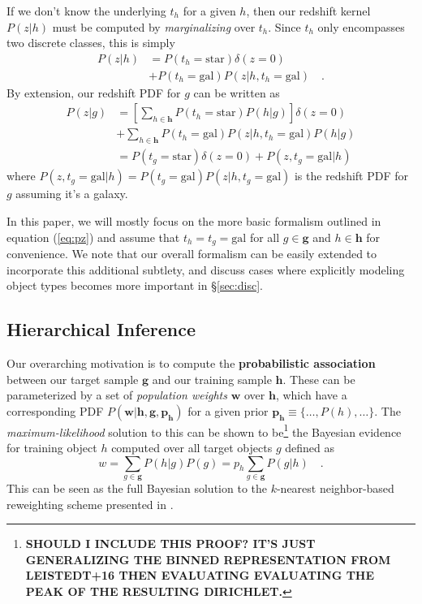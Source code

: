 \documentclass[a4paper,fleqn,usenatbib,english]{mnras}
\begin{document}
If we don't know the underlying $t_h$ for a given $h$, then our redshift kernel $P(z|h)$ must be computed by \textit{marginalizing} over $t_h$. Since $t_h$ only encompasses two discrete classes, this is simply
\begin{align}
P(z|h)&=P(t_h=\mathrm{star})\delta(z=0) \nonumber \\
&+P(t_h=\mathrm{gal})P(z|h,t_h=\mathrm{gal}) \quad .
\end{align}
By extension, our redshift PDF for $g$ can be written as
\begin{align}
P(z|g)&=\left[\sum_{h\in\mathbf{h}}P(t_h=\mathrm{star})P(h|g)\right]\delta(z=0) \nonumber \\
&+\sum_{h\in\mathbf{h}}P(t_h=\mathrm{gal})P(z|h,t_h=\mathrm{gal})P(h|g) \\
&=P(t_g=\mathrm{star})\delta(z=0) + P(z,t_g=\mathrm{gal}|h) \nonumber
\end{align}
where $P(z,t_g=\mathrm{gal}|h)=P(t_g=\mathrm{gal})P(z|h,t_g=\mathrm{gal})$ is the redshift PDF for $g$ assuming it's a galaxy.

In this paper, we will mostly focus on the more basic formalism outlined in equation (\ref{eq:pz}) and assume that $t_h = t_g = \mathrm{gal}$ for all $g \in \mathbf{g}$ and $h \in \mathbf{h}$ for convenience. We note that our overall formalism can be easily extended to incorporate this additional subtlety, and discuss cases where explicitly modeling object types becomes more important in \S\ref{sec:disc}.

\subsection{Hierarchical Inference}
\label{subsec:pop_infer}

Our overarching motivation is to compute the \textbf{probabilistic association} between our target sample $\mathbf{g}$ and our training sample $\mathbf{h}$. These can be parameterized by a set of \textit{population weights} $\mathbf{w}$ over $\mathbf{h}$, which have a corresponding PDF $P(\mathbf{w}|\mathbf{h},\mathbf{g},\mathbf{p_h})$ for a given prior $\mathbf{p_h} \equiv \lbrace \ldots,P(h),\ldots \rbrace$. The \textit{maximum-likelihood} solution to this can be shown to be\footnote{\textbf{SHOULD I INCLUDE THIS PROOF? IT'S JUST GENERALIZING THE BINNED REPRESENTATION FROM LEISTEDT+16 THEN EVALUATING EVALUATING THE PEAK OF THE RESULTING DIRICHLET.}} the Bayesian evidence for training object $h$ computed over all target objects $g$ defined as
\begin{equation}
w = \sum_{g \in \mathbf{g}} P(h|g)P(g) = p_h \sum_{g \in \mathbf{g}} P(g|h) \quad .
\end{equation}
This can be seen as the full Bayesian solution to the $k$-nearest neighbor-based reweighting scheme presented in \citet{lima+08}.
\end{document}
